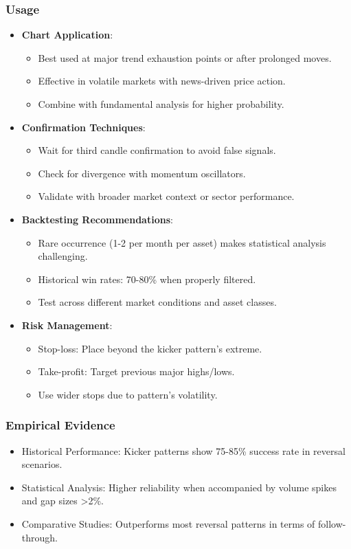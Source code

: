 \documentclass[12pt]{article}
\begin{document}
\subsubsection{Usage}
\begin{itemize}
\item \textbf{Chart Application}:
  \begin{itemize}
  \item Best used at major trend exhaustion points or after prolonged moves.
  \item Effective in volatile markets with news-driven price action.
  \item Combine with fundamental analysis for higher probability.
  \end{itemize}
\item \textbf{Confirmation Techniques}:
  \begin{itemize}
  \item Wait for third candle confirmation to avoid false signals.
  \item Check for divergence with momentum oscillators.
  \item Validate with broader market context or sector performance.
  \end{itemize}
\item \textbf{Backtesting Recommendations}:
  \begin{itemize}
  \item Rare occurrence (1-2 per month per asset) makes statistical analysis challenging.
  \item Historical win rates: 70-80\% when properly filtered.
  \item Test across different market conditions and asset classes.
  \end{itemize}
\item \textbf{Risk Management}:
  \begin{itemize}
  \item Stop-loss: Place beyond the kicker pattern's extreme.
  \item Take-profit: Target previous major highs/lows.
  \item Use wider stops due to pattern's volatility.
  \end{itemize}
\end{itemize}

\subsubsection{Empirical Evidence}
\begin{itemize}
\item Historical Performance: Kicker patterns show 75-85\% success rate in reversal scenarios.
\item Statistical Analysis: Higher reliability when accompanied by volume spikes and gap sizes >2\%.
\item Comparative Studies: Outperforms most reversal patterns in terms of follow-through.
\end{itemize}
\end{document}
